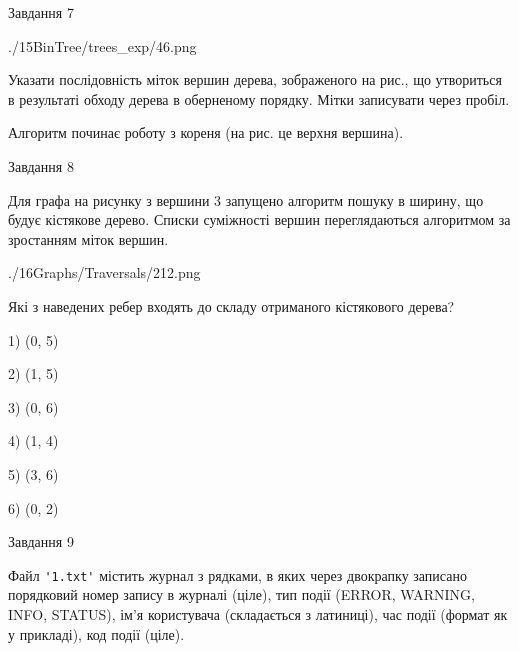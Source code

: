 \documentclass[12pt, ukrainian]{article}
\def\code#1{\Verb!#1!}
\begin{document}
{\newpage
\begin{minipage}[t]{9.7cm}
               
{\begin{center}Завдання {7}\end{center}}
\vspace{-6mm}

\begin{center}
	{./15BinTree/trees_exp/46.png}
\end{center}
Указати послідовність міток вершин дерева, зображеного на рис., що утвориться в результаті обходу дерева в оберненому порядку. Мітки записувати через пробіл.\par Алгоритм починає роботу з кореня (на рис. це верхня вершина).\par

\end{minipage}
\vline \hspace{8mm}
\begin{minipage}[t]{8.0cm}
               
{\begin{center}Завдання {8}\end{center}}
\vspace{-6mm}
Для графа на рисунку з вершини 3 запущено алгоритм пошуку в ширину, що будує кістякове дерево. Списки суміжності вершин переглядаються алгоритмом за зростанням міток вершин.\par
\begin{center}
	{./16Graphs/Traversals/212.png}
\end{center}
\par Які з наведених ребер входять до складу отриманого кістякового дерева?\par
1) (0, 5)\par
2) (1, 5)\par
3) (0, 6)\par
4) (1, 4)\par
5) (3, 6)\par
6) (0, 2)\par
{\vskip 15pt} \par

\end{minipage}

               
{\begin{center}Завдання {9}\end{center}}
\vspace{-6mm}
Файл \code{'1.txt'} містить журнал з рядками, в яких через двокрапку записано поряд\-ко\-вий номер запису в журналі (ціле), тип події (ERROR, WARNING, INFO, STATUS), ім'я користувача (складається з латиниці), час події (фор\-мат як у прикладі), код події (ціле).

}
\end{document}
